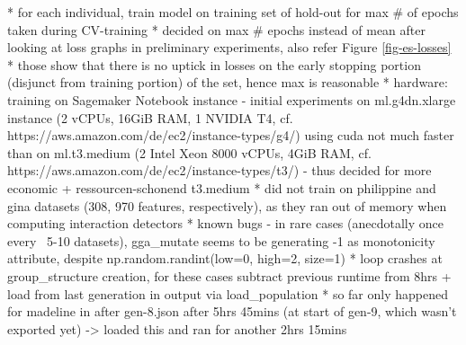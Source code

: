\documentclass[twoside,11pt]{article}
\begin{document}
      * for each individual, train model on training set of hold-out for max \# of epochs taken during CV-training
      * decided on max \# epochs instead of mean after looking at loss graphs in preliminary experiments, also refer Figure \ref{fig-es-losses}
      * those show that there is no uptick in losses on the early stopping portion (disjunct from training portion) of the set, hence max is reasonable
  * hardware: training on Sagemaker Notebook instance
    - initial experiments on ml.g4dn.xlarge instance (2 vCPUs, 16GiB RAM, 1 NVIDIA T4, cf. https://aws.amazon.com/de/ec2/instance-types/g4/)
      using cuda not much faster than on ml.t3.medium (2 Intel Xeon 8000 vCPUs, 4GiB RAM, cf. https://aws.amazon.com/de/ec2/instance-types/t3/)
    - thus decided for more economic + ressourcen-schonend t3.medium
  * did not train on philippine and gina datasets (308, 970 features, respectively), as they ran out of memory when computing interaction detectors
  * known bugs
    - in rare cases (anecdotally once every ~5-10 datasets), gga\_mutate seems to be generating -1 as monotonicity attribute, despite np.random.randint(low=0, high=2, size=1)
      * loop crashes at group\_structure creation, for these cases subtract previous runtime from 8hrs + load from last generation in output via load\_population
      * so far only happened for madeline in after gen-8.json after 5hrs 45mins (at start of gen-9, which wasn't exported yet) -> loaded this and ran for another 2hrs 15mins
\end{document}
